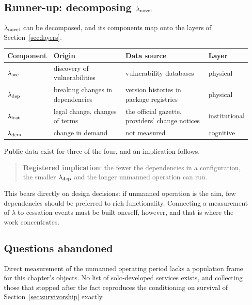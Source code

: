 \subsection{Runner-up: decomposing \texorpdfstring{$\lambda_{\rm novel}$}{lambda}}

$\lambda_{\rm novel}$ can be decomposed, and its components map onto the layers of
Section~\ref{sec:layers}.

\begin{center}
\begin{tabularx}{\textwidth}{@{}llXl@{}}
\toprule
Component & Origin & Data source & Layer \\
\midrule
$\lambda_{\rm sec}$ & discovery of vulnerabilities & vulnerability databases & physical \\
$\lambda_{\rm dep}$ & breaking changes in dependencies & version histories in package registries & physical \\
$\lambda_{\rm inst}$ & legal change, changes of terms & the official gazette, providers' change notices & institutional \\
$\lambda_{\rm dem}$ & change in demand & not measured & cognitive \\
\bottomrule
\end{tabularx}
\label{tab:lambda-novel-decomposition}
\end{center}

Public data exist for three of the four, and an implication follows.

\begin{quote}
\textbf{Registered implication}: the fewer the dependencies in a configuration, the smaller
$\lambda_{\rm dep}$ and the longer unmanned operation can run.
\end{quote}

This bears directly on design decisions: if unmanned operation is the aim, few dependencies
should be preferred to rich functionality. Connecting a measurement of $\lambda$ to cessation
events must be built oneself, however, and that is where the work concentrates.

\subsection{Questions abandoned}

Direct measurement of the unmanned operating period lacks a population frame for this
chapter's objects. No list of solo-developed services exists, and collecting those that
stopped after the fact reproduces the conditioning on survival of
Section~\ref{sec:survivorship} exactly.

